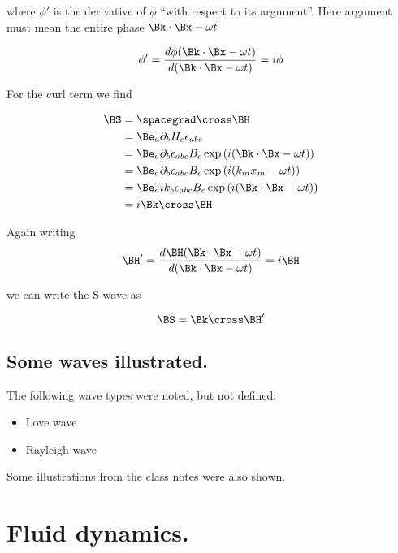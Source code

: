 where $\phi'$ is the derivative of $\phi$ ``with respect to its argument''.   Here argument must mean the entire phase $\Bk \cdot \Bx - \omega t$

\begin{equation}\label{eqn:continuumL8:n}
\phi' = \frac{ d\phi( \Bk \cdot \Bx - \omega t )}{ d(\Bk \cdot \Bx - \omega t) } = i \phi
\end{equation}

For the curl term we find

\begin{align*}
\BS
&= \spacegrad \cross \BH \\
&= \Be_a \partial_b H_c \epsilon_{a b c} \\
&= \Be_a \partial_b \epsilon_{a b c} B_c \exp\left( i ( \Bk \cdot \Bx - \omega t) \right) \\
&= \Be_a \partial_b \epsilon_{a b c} B_c \exp\left( i ( k_m x_m - \omega t) \right) \\
&= \Be_a i k_b \epsilon_{a b c} B_c \exp\left( i ( \Bk \cdot \Bx - \omega t) \right) \\
&= i \Bk \cross \BH
\end{align*}

Again writing
\begin{equation}\label{eqn:continuumL8:n}
\BH' = \frac{ d\BH( \Bk \cdot \Bx - \omega t )}{ d(\Bk \cdot \Bx - \omega t) } = i \BH
\end{equation}

we can write the S wave as

\begin{equation}\label{eqn:continuumL8:n}
\BS = \Bk \cross \BH'
\end{equation}

\subsection{Some waves illustrated.}

The following wave types were noted, but not defined:

\begin{itemize}
\item Love wave
\item Rayleigh wave
\end{itemize}

Some illustrations from the class notes were also shown.

\section{Fluid dynamics.}

